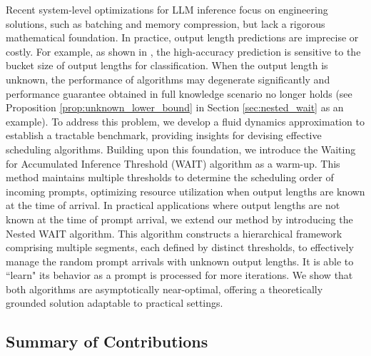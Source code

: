 Recent system-level optimizations for LLM inference \citep{yu2022orca, kwon2023efficient, agrawal2023sarathi, pope2023efficiently, deepseekai2024deepseekv2strongeconomicalefficient, patel2024splitwise, zhong2024distserve} focus on engineering solutions, such as batching and memory compression, but lack a rigorous mathematical foundation. 
In practice, output length predictions are imprecise or costly. For example, as shown in \cite{fu2025efficient}, the high-accuracy prediction is sensitive to the bucket size of output lengths for classification. When the output length is unknown, the performance of algorithms may degenerate significantly and performance guarantee obtained in full knowledge scenario no longer holds (see Proposition \ref{prop:unknown_lower_bound} in Section \ref{sec:nested_wait} as an example). To address this problem, we develop a fluid dynamics approximation to establish a tractable benchmark, providing insights for devising effective scheduling algorithms. Building upon this foundation, we introduce the Waiting for Accumulated Inference Threshold (WAIT) algorithm as a warm-up. This method maintains multiple thresholds to determine the scheduling order of incoming prompts, optimizing resource utilization when output lengths are known at the time of arrival. In practical applications where output lengths are not known at the time of prompt arrival, we extend our method by introducing the Nested WAIT algorithm. This algorithm constructs a hierarchical framework comprising multiple segments, each defined by distinct thresholds, to effectively manage the random prompt arrivals with unknown output lengths. It is able to ``learn" its behavior as a prompt is processed for more iterations. We show that both algorithms are asymptotically near-optimal, offering a theoretically grounded solution adaptable to practical settings. 

\subsection{Summary of Contributions}

